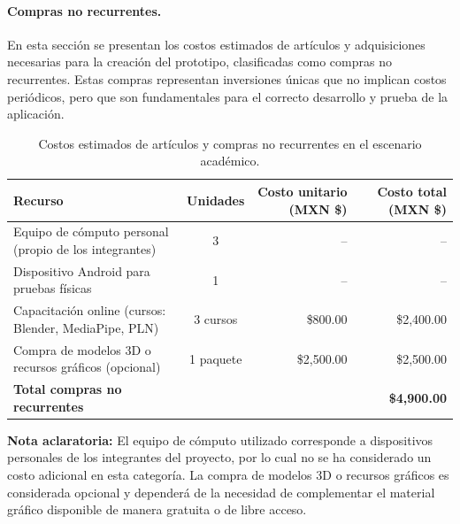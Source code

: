 \paragraph{\textbf{Compras no recurrentes.}} 
En esta sección se presentan los costos estimados de artículos y adquisiciones necesarias para la creación del prototipo, clasificadas como compras no recurrentes. Estas compras representan inversiones únicas que no implican costos periódicos, pero que son fundamentales para el correcto desarrollo y prueba de la aplicación.

\begin{table}[H]
	\centering
	\renewcommand{\arraystretch}{1.6}
	\setlength{\tabcolsep}{10pt}
	\Huge
	\begin{adjustbox}{max width=\textwidth}
		\begin{tabular}{|p{7cm}|c|r|r|}
			\hline
			\textbf{Recurso} & \textbf{Unidades} & \textbf{Costo unitario (MXN \$)} & \textbf{Costo total (MXN \$)} \\ \hline
			Equipo de cómputo personal (propio de los integrantes) & 3 & -- & -- \\ \hline
			Dispositivo Android para pruebas físicas & 1 & -- & -- \\ \hline
			Capacitación online (cursos: Blender, MediaPipe, PLN) & 3 cursos & \$800.00 & \$2,400.00 \\ \hline
			Compra de modelos 3D o recursos gráficos (opcional) & 1 paquete & \$2,500.00 & \$2,500.00 \\ \hline
			\textbf{Total compras no recurrentes} & & & \textbf{\$4,900.00} \\ \hline
		\end{tabular}
	\end{adjustbox}
	\caption{Costos estimados de artículos y compras no recurrentes en el escenario académico.}
	\label{tab:compras_no_recurrentes}
\end{table}


\noindent \textbf{Nota aclaratoria:}  
El equipo de cómputo utilizado corresponde a dispositivos personales de los integrantes del proyecto, por lo cual no se ha considerado un costo adicional en esta categoría. La compra de modelos 3D o recursos gráficos es considerada opcional y dependerá de la necesidad de complementar el material gráfico disponible de manera gratuita o de libre acceso.

